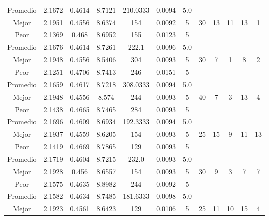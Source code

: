 \begin{table}[h!]
\begin{center}
\begin{tabular}{|c|c|c|c|c|c|c|c|c|c|c|c|}
        \hline
        \hline
            Promedio  & 2.1672 & 0.4614 & 8.7121 & 210.0333 & 0.0094 & 5.0 &  &  &  &  & \\
            \cline{1-7}
            Mejor & 2.1951 & 0.4556  & 8.6374 & 154 & 0.0092 & 5 & 30 & 13 & 11 & 13 & 1\\
            \cline{1-7}
            Peor & 2.1369 & 0.468  & 8.6952 & 155 & 0.0123 & 5 &  &  &  &  & \\
        \hline
        \hline
            Promedio  & 2.1676 & 0.4614 & 8.7261 & 222.1 & 0.0096 & 5.0 &  &  &  &  & \\
            \cline{1-7}
            Mejor & 2.1948 & 0.4556  & 8.5406 & 304 & 0.0093 & 5 & 30 & 7 & 1 & 8 & 2\\
            \cline{1-7}
            Peor & 2.1251 & 0.4706  & 8.7413 & 246 & 0.0151 & 5 &  &  &  &  & \\
        \hline
        \hline
            Promedio  & 2.1659 & 0.4617 & 8.7218 & 308.0333 & 0.0094 & 5.0 &  &  &  &  & \\
            \cline{1-7}
            Mejor & 2.1948 & 0.4556  & 8.574 & 244 & 0.0093 & 5 & 40 & 7 & 3 & 13 & 4\\
            \cline{1-7}
            Peor & 2.1438 & 0.4665  & 8.7465 & 284 & 0.0093 & 5 &  &  &  &  & \\
        \hline
        \hline
            Promedio  & 2.1696 & 0.4609 & 8.6934 & 192.3333 & 0.0094 & 5.0 &  &  &  &  & \\
            \cline{1-7}
            Mejor & 2.1937 & 0.4559  & 8.6205 & 154 & 0.0093 & 5 & 25 & 15 & 9 & 11 & 13\\
            \cline{1-7}
            Peor & 2.1419 & 0.4669  & 8.7865 & 129 & 0.0093 & 5 &  &  &  &  & \\
        \hline
        \hline
            Promedio  & 2.1719 & 0.4604 & 8.7215 & 232.0 & 0.0093 & 5.0 &  &  &  &  & \\
            \cline{1-7}
            Mejor & 2.1928 & 0.456  & 8.6557 & 154 & 0.0093 & 5 & 30 & 9 & 3 & 7 & 7\\
            \cline{1-7}
            Peor & 2.1575 & 0.4635  & 8.8982 & 244 & 0.0092 & 5 &  &  &  &  & \\
        \hline
        \hline
            Promedio  & 2.1582 & 0.4634 & 8.7485 & 181.6333 & 0.0098 & 5.0 &  &  &  &  & \\
            \cline{1-7}
            Mejor & 2.1923 & 0.4561  & 8.6423 & 129 & 0.0106 & 5 & 25 & 11 & 10 & 15 & 4\\

\end{tabular}
\end{center}
\end{table}
